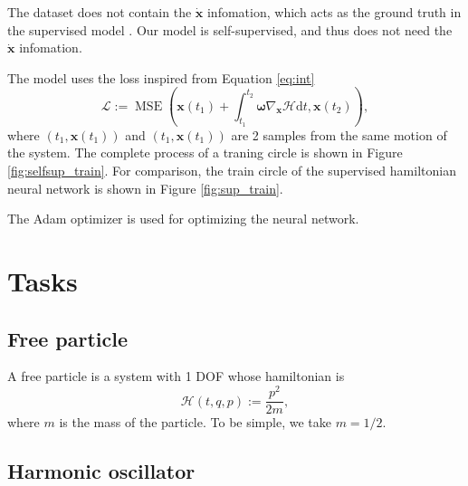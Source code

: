 \documentclass{article}
\begin{document}
The dataset does not contain the $\dot{\mathbf x}$ infomation,
which acts as the ground truth in the supervised model \cite{greydanus2019hamiltonian}.
Our model is self-supervised, and thus does not need the $\dot{\mathbf x}$ infomation.

The model uses the loss inspired from Equation \ref{eq:int}
\begin{equation}
	\mathcal L:=\operatorname{MSE}\left(\mathbf x\left(t_1\right)+\int_{t_1}^{t_2}\boldsymbol\omega\nabla_{\mathbf x}\mathcal H\mathrm dt,\mathbf x\left(t_2\right)\right),
\end{equation}
where $\left(t_1,\mathbf x\left(t_1\right)\right)$ and $\left(t_1,\mathbf x\left(t_1\right)\right)$
are 2 samples from the same motion of the system.
The complete process of a traning circle is shown in Figure \ref{fig:selfsup_train}.
For comparison, the train circle of the supervised hamiltonian neural network
is shown in Figure \ref{fig:sup_train}.

The Adam optimizer \cite{kingma2017adam} is used for optimizing the neural network.

\section{Tasks}

\subsection{Free particle}

A free particle is a system with 1 DOF whose hamiltonian is
\begin{equation*}
	\mathcal H\left(t,q,p\right):=\frac{p^2}{2m},
\end{equation*}
where $m$ is the mass of the particle.
To be simple, we take $m=1/2$.

\subsection{Harmonic oscillator}



\end{document}
